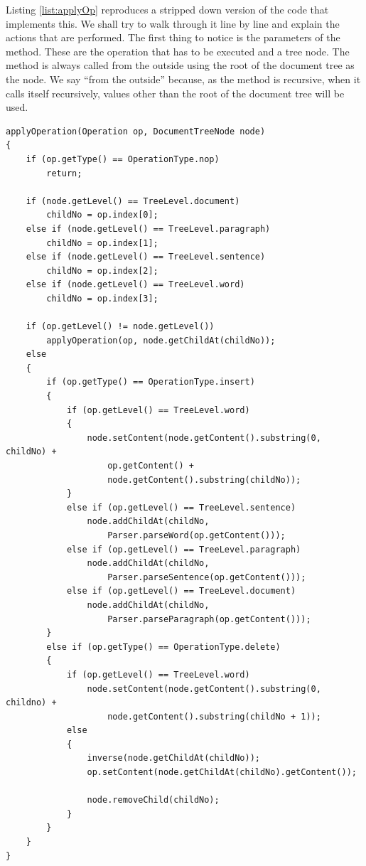 Listing \ref{list:applyOp} reproduces a stripped down version of the code that implements
this. We shall try to walk through it line by line and explain the actions that are performed.
The first thing to notice is the parameters of the method. These are the operation that
has to be executed and a tree node. The method is always called from the outside using
the root of the document tree as the node. We say ``from the outside'' because, as the method is
recursive, when it calls itself recursively, values other than the root of the document
tree will be used.

\begin{lstlisting}[frame=lines,float=p,caption=apply operation,label=list:applyOp]
applyOperation(Operation op, DocumentTreeNode node)
{
	if (op.getType() == OperationType.nop)
		return;

	if (node.getLevel() == TreeLevel.document)
		childNo = op.index[0];
	else if (node.getLevel() == TreeLevel.paragraph)
		childNo = op.index[1];
	else if (node.getLevel() == TreeLevel.sentence)
		childNo = op.index[2];
	else if (node.getLevel() == TreeLevel.word)
		childNo = op.index[3];

	if (op.getLevel() != node.getLevel())
		applyOperation(op, node.getChildAt(childNo));
	else
	{
		if (op.getType() == OperationType.insert)
		{
			if (op.getLevel() == TreeLevel.word)
			{
				node.setContent(node.getContent().substring(0, childNo) +
					op.getContent() +
					node.getContent().substring(childNo));
			}
			else if (op.getLevel() == TreeLevel.sentence)
				node.addChildAt(childNo,
					Parser.parseWord(op.getContent()));
			else if (op.getLevel() == TreeLevel.paragraph)
				node.addChildAt(childNo,
					Parser.parseSentence(op.getContent()));
			else if (op.getLevel() == TreeLevel.document)
				node.addChildAt(childNo,
					Parser.parseParagraph(op.getContent()));
		}
		else if (op.getType() == OperationType.delete)
		{
			if (op.getLevel() == TreeLevel.word)
				node.setContent(node.getContent().substring(0, childno) +
					node.getContent().substring(childNo + 1));
			else
			{
				inverse(node.getChildAt(childNo));
				op.setContent(node.getChildAt(childNo).getContent());

				node.removeChild(childNo);
			}
		}
	}
}
\end{lstlisting}

